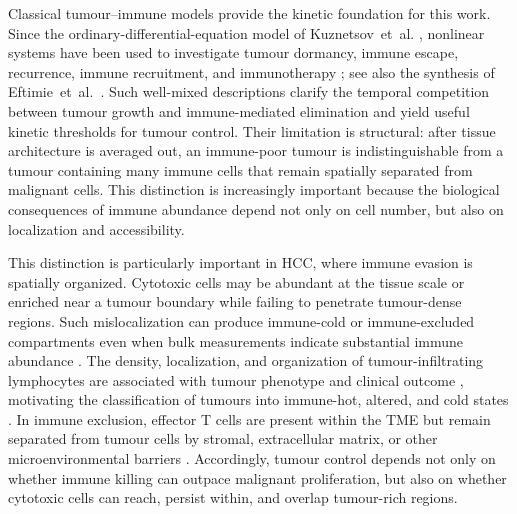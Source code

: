 \documentclass[]{interact}
\theoremstyle{plain}%
\theoremstyle{definition}
\theoremstyle{remark}
\begin{document}
Classical tumour--immune models provide the kinetic foundation for this work. Since the ordinary-differential-equation model of Kuznetsov~et~al. \cite{kuznetsov1994nonlinear,gao2022rolling}, nonlinear systems have been used to investigate tumour dormancy, immune escape, recurrence, immune recruitment, and immunotherapy
\cite{kirschner1998modeling,de2001mathematical,mehdizadeh2023targeting,yu2026beyond,barrera2025impact}; see also the synthesis of Eftimie~et~al.~\cite{eftimie2011interactions,yu2026physics}. Such well-mixed descriptions clarify the temporal competition between tumour growth and immune-mediated elimination and yield useful kinetic thresholds for tumour control. Their limitation is structural: after tissue architecture is averaged out, an immune-poor tumour is indistinguishable from a tumour containing many immune cells that remain spatially separated from malignant cells. This distinction is increasingly important because the biological consequences of immune abundance depend not only on cell number, but also on localization and accessibility.

This distinction is particularly important in HCC, where immune evasion is spatially organized. Cytotoxic cells may be abundant at the tissue scale or enriched near a tumour boundary while failing to penetrate tumour-dense regions. Such mislocalization can produce immune-cold or immune-excluded compartments even when bulk measurements indicate substantial immune abundance \cite{galon2006type,yu2026age,mariathasan2018tgfbeta,liu2023identification}.
The density, localization, and organization of tumour-infiltrating lymphocytes are associated with tumour phenotype and clinical outcome \cite{lopez2025biological,yu2026pattern,brummel2023tumour}, motivating the classification of tumours into immune-hot, altered, and cold states \cite{galon2019approaches}. In immune exclusion, effector T cells are present within the TME but remain separated from tumour cells by stromal, extracellular matrix, or other microenvironmental barriers \cite{joyce2015t,yu2024extracellular,wang2026algebraic,bruni2023cancer}. Accordingly, tumour control depends not only on whether immune killing can outpace malignant proliferation, but also on whether cytotoxic cells can reach, persist within, and overlap tumour-rich regions.
\end{document}
